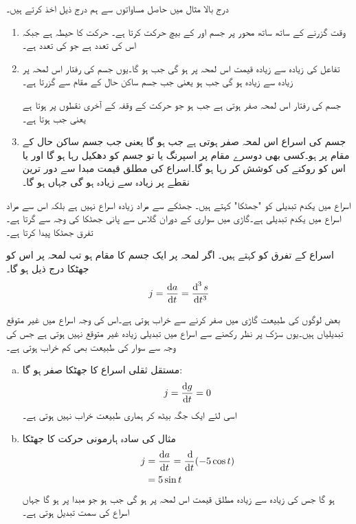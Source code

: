 درج بالا مثال میں حاصل مساواتوں سے ہم درج ذیل اخذ کرتے ہیں۔
\begin{enumerate}[1.]
\item
وقت گزرنے کے ساتھ ساتھ  محور پر جسم  اور  کے بیچ حرکت کرتا ہے۔ حرکت کا حیطہ  ہے جبکہ اس کی تعدد  ہے جو  کی تعدد ہے۔
\item
تفاعل  کی زیادہ سے زیادہ قیمت اس لمحہ پر ہو گی جب  ہو گا۔یوں جسم کی رفتار  اس لمحہ پر زیادہ سے زیادہ  ہو گی جب  ہو یعنی جب جسم ساکن حال کے مقام سے گزرتا ہے۔

جسم کی رفتار اس لمحہ صفر ہوتی ہے جب  ہو جو حرکت کے وقفہ کے آخری نقطوں پر ہوتا ہے یعنی جب  ہوتا ہے۔
\item
جسم کی اسراع  اس لمحہ صفر ہوتی ہے جب  ہو گا یعنی جب جسم ساکن حال کے مقام پر ہو۔کسی بھی دوسرے مقام پر اسپرنگ یا تو جسم کو دھکیل رہا ہو گا اور یا اس کو روکنے کی کوشش کر رہا ہو گا۔اسراع کی مطلق قیمت مبدا سے دور ترین نقطے پر زیادہ سے زیادہ ہو گی جہاں  ہو گا۔  
\end{enumerate}

اسراع میں یکدم تبدیلی کو "جھٹکا" کہتے ہیں۔ جھٹکے سے مراد زیادہ اسراع نہیں ہے بلکہ اس سے مراد اسراع میں یکدم تبدیلی ہے۔گاڑی میں سواری کے دوران گلاس سے پانی جھٹکا کی وجہ سے  گرتا ہے۔ تفرق  جھٹکا پیدا کرتا ہے۔

اسراع کے تفرق کو  کہتے ہیں۔ اگر لمحہ  پر ایک جسم کا مقام  ہو تب لمحہ  پر اس کو جھٹکا درج ذیل ہو گا۔
\begin{align*}
j=\frac{\dif a}{\dif t}=\frac{\dif ^{\,3}s}{\dif t^3}
\end{align*}

بعض لوگوں کی طبیعت  گاڑی میں صفر کرنے سے  خراب ہوتی ہے۔اس کی وجہ اسراع میں غیر متوقع تبدیلیاں ہیں۔یوں سڑک پر نظر رکھنے سے اسراع میں تبدیلی زیادہ غیر متوقع نہیں ہوتی ہے جس کی وجہ سے سوار کی طبیعت بھی کم خراب ہوتی ہے۔  

\begin{enumerate}[a.]
\item
مستقل ثقلی اسراع  کا جھٹکا صفر ہو گا:
\begin{align*}
j=\frac{\dif g}{\dif t}=0
\end{align*}
اسی لئے ایک جگہ بیٹھ کر ہماری طبیعت خراب نہیں ہوتی ہے۔
\item
مثال  کی سادہ ہارمونی حرکت  کا جھٹکا
\begin{align*}
j&=\frac{\dif a}{\dif t}=\frac{\dif}{\dif t}(-5\cos t)\\
&=5\sin t
\end{align*}
ہو گا جس کی زیادہ سے زیادہ مطلق قیمت اس لمحہ پر ہو گی جب  ہو جو مبدا پر ہو گا جہاں اسراع کی سمت تبدیل ہوتی ہے۔
\end{enumerate}

